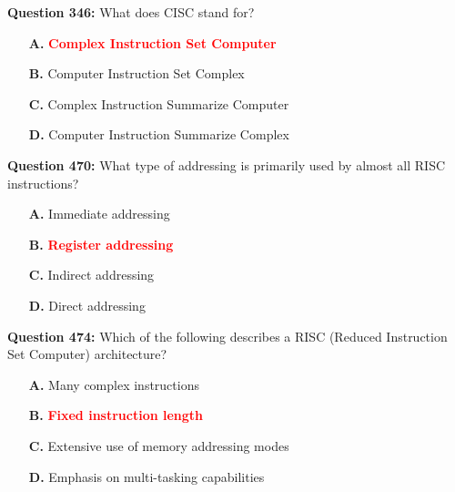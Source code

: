 \documentclass[12pt,a4paper]{article}
\begin{document}
\vspace{0.5cm}

\vspace{0.5cm}

\textbf{Question 346:} What does CISC stand for?

\begin{itemize}
    \item[\textbf{A.}] \textcolor{red}{\textbf{Complex Instruction Set Computer}}
    \item[\textbf{B.}] Computer Instruction Set Complex
    \item[\textbf{C.}] Complex Instruction Summarize Computer
    \item[\textbf{D.}] Computer Instruction Summarize Complex
\end{itemize}

\vspace{0.5cm}

\vspace{0.5cm}

\textbf{Question 470:} What type of addressing is primarily used by almost all RISC instructions?

\begin{itemize}
    \item[\textbf{A.}] Immediate addressing
    \item[\textbf{B.}] \textcolor{red}{\textbf{Register addressing}}
    \item[\textbf{C.}] Indirect addressing
    \item[\textbf{D.}] Direct addressing
\end{itemize}

\vspace{0.5cm}

\vspace{0.5cm}

\textbf{Question 474:} Which of the following describes a RISC (Reduced Instruction Set Computer) architecture?

\begin{itemize}
    \item[\textbf{A.}] Many complex instructions
    \item[\textbf{B.}] \textcolor{red}{\textbf{Fixed instruction length}}
    \item[\textbf{C.}] Extensive use of memory addressing modes
    \item[\textbf{D.}] Emphasis on multi-tasking capabilities
\end{itemize}

\vspace{0.5cm}
\end{document}
